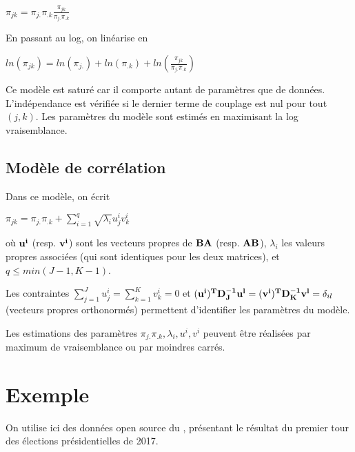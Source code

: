 \documentclass[letterpaper,10pt,french]{sphinxmanual}
\begin{document}
\sphinxAtStartPar
\(\pi_{jk} = \pi_{j.}\pi_{.k}\frac{\pi_{jk}}{\pi_{j.}\pi_{.k}}\)

\sphinxAtStartPar
En passant au log, on linéarise en

\sphinxAtStartPar
\(ln\left (\pi_{jk}\right ) =  ln (\pi_{j.}) + ln (\pi_{.k})  + ln \left( \frac{\pi_{jk}}{\pi_{j.}\pi_{.k}}\right )\)

\sphinxAtStartPar
Ce modèle est saturé car il comporte autant de paramètres que de données.  L’indépendance est vérifiée si le dernier terme de couplage est nul pour tout \((j,k)\). Les paramètres du modèle sont estimés en maximisant la log vraisemblance.


\subsection{Modèle de corrélation}
\label{\detokenize{afc:modele-de-correlation}}
\sphinxAtStartPar
Dans ce modèle, on écrit

\sphinxAtStartPar
\(\pi_{jk} = \pi_{j.}\pi_{.k} + \displaystyle\sum_{i=1}^q \sqrt{\lambda_i} u^i_jv^i_k\)

\sphinxAtStartPar
où \({\bf u^i}\) (resp. \({\bf v^i}\)) sont les vecteurs propres de \({\bf BA}\) (resp. \({\bf AB}\)),  \(\lambda_i\) les valeurs propres associées (qui sont identiques pour les deux matrices), et \(q\leq min(J-1,K-1)\).

\sphinxAtStartPar
Les contraintes \(\displaystyle\sum_{j=1}^J u^i_j =  \displaystyle\sum_{k=1}^K v^i_k = 0\)  et \({\bf (u^i)^TD_J^{-1} u^l }= {\bf (v^i)^TD_K^{-1} v^l} = \delta_{il}\) (vecteurs propres orthonormés) permettent d’identifier les paramètres du modèle.

\sphinxAtStartPar
Les estimations des paramètres \(\pi_{j.}\pi_{.k} ,\lambda_i,u^i,v^i\) peuvent être réalisées par maximum de vraisemblance ou par moindres carrés.


\section{Exemple}
\label{\detokenize{afc:exemple}}
\sphinxAtStartPar
On utilise ici des données open source du , présentant le résultat du premier tour des élections présidentielles de 2017.
\end{document}
